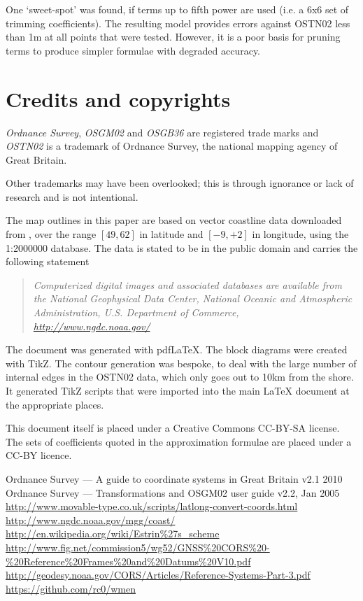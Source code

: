 \documentclass[10pt,a4paper]{article}
\begin{document}
One `sweet-spot' was found, if terms up to fifth power are used (i.e. a 6x6 set
of trimming coefficients).  The resulting model provides errors against OSTN02
less than 1m at all points that were tested.  However, it is a poor basis for
pruning terms to produce simpler formulae with degraded accuracy.

\section {Credits and copyrights}

\textsl{Ordnance Survey}, \textsl{OSGM02} and \textsl{OSGB36} are registered
trade marks and \textsl{OSTN02} is a trademark of Ordnance Survey, the national
mapping agency of Great Britain.

Other trademarks may have been overlooked; this is through ignorance or lack of
research and is not intentional.

The map outlines in this paper are based on vector coastline data downloaded
from \cite{ngdc}, over the range $[49,62]$ in latitude and $[-9,+2]$ in
longitude, using the 1:2000000 database.  The data is stated to be in the
public domain and carries the following statement
\begin{quote}
\textsl{
Computerized digital images and associated databases are available from the
National Geophysical Data Center, National Oceanic and Atmospheric
Administration, U.S. Department of Commerce, \url{http://www.ngdc.noaa.gov/}}
\end{quote}

The document was generated with pdf\LaTeX.  The block diagrams were created
with TikZ.  The contour generation was bespoke, to deal with the large number
of internal edges in the OSTN02 data, which only goes out to 10km from the
shore.  It generated TikZ scripts that were imported into the main \LaTeX{}
document at the appropriate places.

This document itself is placed under a Creative Commons CC-BY-SA license.  The
sets of coefficients quoted in the approximation formulae are placed under a
CC-BY licence.

\begin{thebibliography}{99}
   Ordnance Survey --- A guide to coordinate systems in Great Britain v2.1 2010
   Ordnance Survey --- Transformations and OSGM02 user guide v2.2, Jan 2005
   \url{http://www.movable-type.co.uk/scripts/latlong-convert-coords.html}
   \url{http://www.ngdc.noaa.gov/mgg/coast/}
   \url{http://en.wikipedia.org/wiki/Estrin%27s_scheme}
   \url{http://www.fig.net/commission5/wg52/GNSS%20CORS%20-%20Reference%20Frames%20and%20Datums%20V10.pdf}
   \url{http://geodesy.noaa.gov/CORS/Articles/Reference-Systems-Part-3.pdf}
   \url{https://github.com/rc0/wmen}
\end{thebibliography}
\end{document}
